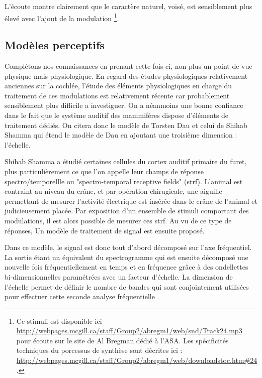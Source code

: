 L'écoute montre clairement que le caractère naturel, voisé, est sensiblement plus élevé avec l'ajout de la modulation \footnote{Ce stimuli est disponible ici \url{http://webpages.mcgill.ca/staff/Group2/abregm1/web/snd/Track24.mp3} pour écoute sur le site de Al Bregman dédié à l'ASA. Les spécificités techniques du porcessus de synthèse sont décrites ici : \url{http://webpages.mcgill.ca/staff/Group2/abregm1/web/downloadstoc.htm\#24}.}.

\subsection{Modèles perceptifs}

Complétons nos connaissances en prenant cette fois ci, non plus un point de vue physique mais physiologique. En regard des études physiologiques relativement anciennes sur la cochlée\cite{}, l'étude des éléments physiologiques en charge du traitement de ces modulations est relativement récente car probablement sensiblement plus difficile a investiguer. On a néanmoins une bonne confiance dans le fait que le système auditif des mammifères dispose d'éléments de traitement dédiés. On citera donc le modèle de Torsten Dau\cite{dau1997modeling} et celui de Shihab Shamma\cite{fritz2003rapid} qui étend le modèle de Dau en ajoutant une troisième dimension : l'échelle.

Shihab Shamma a étudié certaines cellules du cortex auditif primaire du furet, plus particulièrement ce que l'on appelle leur champs de réponse spectro/temporellle ou "spectro-temporal receptive fields" (strf). L'animal est contraint au niveau du crâne, et par opération chirugicale, une aiguille permettant de mesurer l'activité électrique est insérée dans le crâne de l'animal et judicieusement placée. Par exposition d'un ensemble de stimuli comportant des modulations, il est alors possible de mesurer ces strf. Au vu de ce type de réponses, Un modèle de traitement de signal est ensuite proposé.

Dans ce modèle, le signal est donc tout d'abord décomposé sur l'axe fréquentiel. La sortie étant un équivalent du spectrogramme qui est ensuite décomposé une nouvelle fois fréquentiellement en temps et en fréquence grâce à des ondellettes bi-dimensionnelles paramétrées avec un facteur d'échelle. La dimension de l'échelle permet de définir le nombre de bandes qui sont conjointement utilisées pour effectuer cette seconde analyse fréquentielle .

